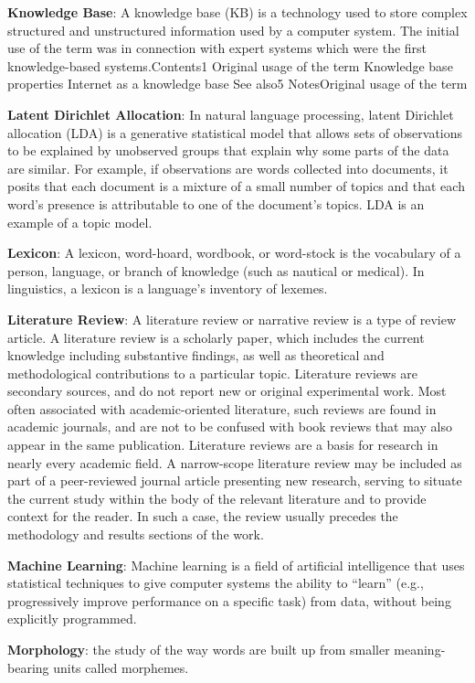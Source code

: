 \documentclass[]{book}
\theoremstyle{definition}
\theoremstyle{definition}
\theoremstyle{definition}
\theoremstyle{remark}
\begin{document}
\textbf{Knowledge Base}: A knowledge base (KB) is a technology used to
store complex structured and unstructured information used by a computer
system. The initial use of the term was in connection with expert
systems which were the first knowledge-based systems.Contents1 Original
usage of the term Knowledge base properties Internet as a knowledge base
See also5 NotesOriginal usage of the term

\textbf{Latent Dirichlet Allocation}: In natural language processing,
latent Dirichlet allocation (LDA) is a generative statistical model that
allows sets of observations to be explained by unobserved groups that
explain why some parts of the data are similar. For example, if
observations are words collected into documents, it posits that each
document is a mixture of a small number of topics and that each word's
presence is attributable to one of the document's topics. LDA is an
example of a topic model.

\textbf{Lexicon}: A lexicon, word-hoard, wordbook, or word-stock is the
vocabulary of a person, language, or branch of knowledge (such as
nautical or medical). In linguistics, a lexicon is a language's
inventory of lexemes.

\textbf{Literature Review}: A literature review or narrative review is a
type of review article. A literature review is a scholarly paper, which
includes the current knowledge including substantive findings, as well
as theoretical and methodological contributions to a particular topic.
Literature reviews are secondary sources, and do not report new or
original experimental work. Most often associated with academic-oriented
literature, such reviews are found in academic journals, and are not to
be confused with book reviews that may also appear in the same
publication. Literature reviews are a basis for research in nearly every
academic field. A narrow-scope literature review may be included as part
of a peer-reviewed journal article presenting new research, serving to
situate the current study within the body of the relevant literature and
to provide context for the reader. In such a case, the review usually
precedes the methodology and results sections of the work.

\textbf{Machine Learning}: Machine learning is a field of artificial
intelligence that uses statistical techniques to give computer systems
the ability to ``learn'' (e.g., progressively improve performance on a
specific task) from data, without being explicitly programmed.

\textbf{Morphology}: the study of the way words are built up from
smaller meaning-bearing units called morphemes.
\end{document}
